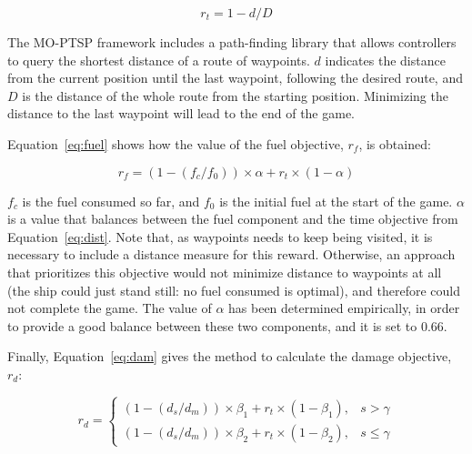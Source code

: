 \documentclass[journal]{IEEEtran}
\begin{document}
\begin{equation}	\label{eq:dist}
r_t = 1 - d/D
\end{equation}

The MO-PTSP framework includes a path-finding library that allows controllers to query the shortest distance of a route of waypoints. $d$ indicates the distance from the current position until the last waypoint, following the desired route, and $D$ is the distance of the whole route from the starting position. Minimizing the distance to the last waypoint will lead to the end of the game.

Equation~\ref{eq:fuel} shows how the value of the fuel objective, $r_f$, is obtained:


\begin{equation}	\label{eq:fuel}
r_f = (1 - (f_c/f_0)) \times \alpha + r_t \times (1 - \alpha)
\end{equation}

$f_c$ is the fuel consumed so far, and $f_0$ is the initial fuel at the start of the game. $\alpha$ is a value that balances between the fuel component and the time objective from Equation~\ref{eq:dist}. Note that, as waypoints needs to keep being visited, it is necessary to include a distance measure for this reward. Otherwise, an approach that prioritizes this objective would not minimize distance to waypoints at all (the ship could just stand still: no fuel consumed is optimal), and therefore could not complete the game. The value of $\alpha$ has been determined empirically, in order to provide a good balance between these two components, and it is set to $0.66$.

Finally, Equation~\ref{eq:dam} gives the method to calculate the damage objective, $r_d$:


\begin{equation}	\label{eq:dam}
r_d = 
\begin{cases}
	(1 - (d_s/d_m)) \times \beta_{1} + r_t \times (1 - \beta_{1}), & s > \gamma\\
	(1 - (d_s/d_m)) \times \beta_{2} + r_t \times (1 - \beta_{2}), & s \leq \gamma
\end{cases}
\end{equation}
\end{document}
